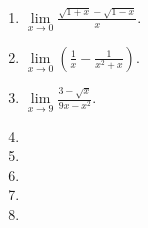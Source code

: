 \begin{multicols}{2}
\begin{enumerate}[ref={\fcProblemRef}]
\item $\displaystyle\lim\limits_{x\to 0} \frac{\sqrt{1+x}- \sqrt{1-x}}{x}$.

\item $\displaystyle\lim\limits_{x\to 0}\left(\frac{1}x -\frac{1}{x^2+x}\right)$.

\item $\displaystyle\lim\limits_{x\to 9} \frac{3-\sqrt{x}}{9x-x^2}$.

\item 
\item 
\item 

\item 

\item 

\end{enumerate}
\end{multicols}
